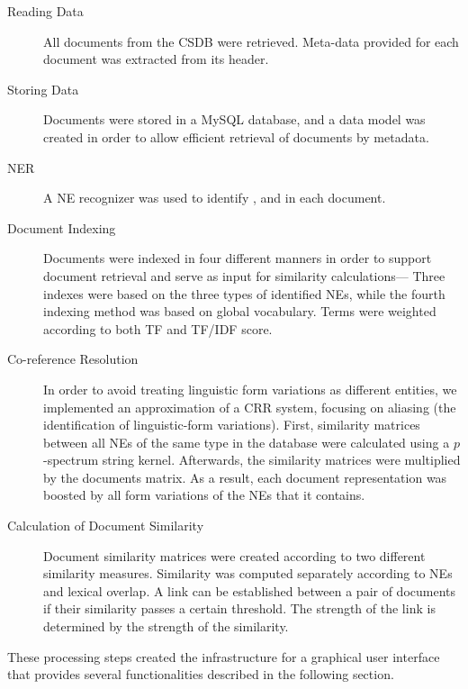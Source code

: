 \begin{description}
\item[Reading Data] All documents from the CSDB were retrieved. Meta-data provided for each document was extracted from its header.
\item[Storing Data] Documents were stored in a MySQL database, and a data model was created in order to allow efficient retrieval of documents by metadata.
\item[NER] A NE recognizer was used to identify ,  and  in each document.
\item[Document Indexing] Documents were indexed in four different manners in order to support document retrieval and serve as input for similarity calculations--- Three indexes were based on the three types of identified NEs, while the fourth indexing method was based on global vocabulary. Terms were weighted according to both TF and TF/IDF score.
\item[Co-reference Resolution] In order to avoid treating linguistic form variations as different entities, we implemented an approximation of a CRR system, focusing on aliasing (the identification of linguistic-form variations).
First, similarity matrices between all NEs of the same type in the database were calculated using a $p$-spectrum string kernel.
Afterwards, the similarity matrices were multiplied by the documents matrix. As a result, each document representation was boosted by all form 
variations of the NEs that it contains.
\item[Calculation of Document Similarity] Document similarity matrices were created according to two different similarity measures. 
Similarity was computed separately according to NEs and lexical overlap. 
A link can be established between a pair of documents if their similarity passes a certain threshold. 
The strength of the link is determined by the strength of the similarity.
\end{description}

These processing steps created the infrastructure for a graphical user interface that provides several
functionalities described in the following section.

